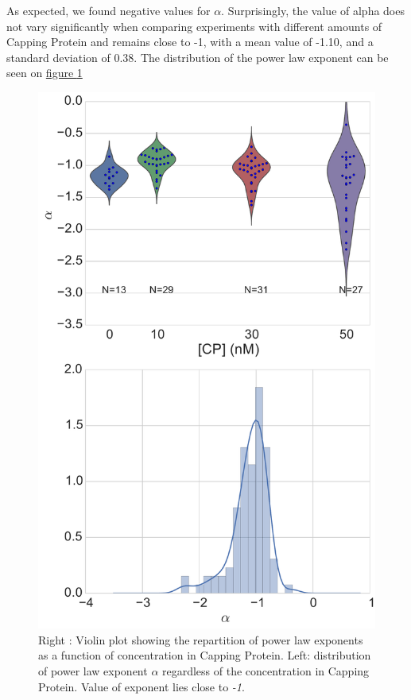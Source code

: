 \documentclass[A4paperpaper,11pt,english]{sphinxmanual}
\begin{document}
As expected, we found negative values for \(\alpha\). Surprisingly, the value
of alpha does not vary significantly when comparing experiments with different
amounts of Capping Protein and remains close to -1, with a mean value of -1.10, and
a standard deviation of 0.38. The distribution of the power law exponent can be
seen on \hyperref[index-latex:power-law-exponent]{figure  \ref*{index-latex:power-law-exponent}}
\begin{figure}[htbp]
\centering
\capstart

\includegraphics[width=0.600\linewidth]{alpha_violin.pdf}
\caption{Right : Violin plot showing the repartition of power law exponents as a function of concentration in Capping Protein. Left: distribution of power law exponent
\(\alpha\) regardless of the concentration in Capping Protein. Value of
exponent lies close to \emph{-1}.}\label{index-latex:power-law-exponent}\end{figure}
\end{document}
